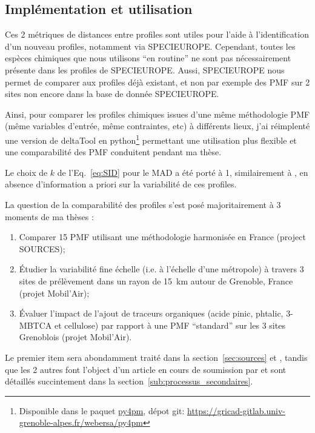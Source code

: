 \subsection{Implémentation et utilisation}%
\label{sub:implémentation_et_utilisation}

Ces 2 métriques de distances entre profiles sont utiles pour l'aide à l'identification
d'un nouveau profiles, notamment via SPECIEUROPE. Cependant, toutes les espèces chimiques
que nous utilisons ``en routine'' ne sont pas nécessairement présente dans les profiles de
SPECIEUROPE. Aussi, SPECIEUROPE nous permet de comparer aux profiles déjà existant, et non
par exemple des PMF sur 2 sites non encore dans la base de donnée SPECIEUROPE.

Ainsi, pour comparer les profiles chimiques issues d'une même méthodologie PMF (même
variables d'entrée, même contraintes, etc) à différents lieux, j'ai réimplenté une version
de deltaTool en python\footnote{Disponible dans le paquet
    \href{https://pypi.org/project/py4pm/}{py4pm}, dépot git:
\url{https://gricad-gitlab.univ-grenoble-alpes.fr/webersa/py4pm}
} permettant une
utilisation plus flexible et une comparabilité des PMF conduitent pendant ma thèse.

Le choix de $k$ de l'Eq.~\ref{eq:SID} pour le MAD a été porté à 1, similairement à
\cite{pernigottiDeltaSA2018}, en absence d'information a priori sur la variabilité de ces
profiles.

La question de la comparabilité des profiles s'est posé majoritairement à 3 moments de ma
thèses :
\begin{enumerate}
    \item Comparer 15 PMF utilisant une méthodologie harmonisée en France (project
        SOURCES);
    \item Étudier la variabilité fine échelle (i.e. à l'échelle d'une métropole) à travers
        3 sites de prélèvement dans un rayon de \SI{15}{\kilo\m} autour de Grenoble, France
        (projet Mobil'Air);
    \item Évaluer l'impact de l'ajout de traceurs organiques (acide pinic, phtalic,
        3-MBTCA et cellulose) par rapport à une PMF ``standard'' sur les 3 sites
        Grenoblois (projet Mobil'Air).
\end{enumerate}

Le premier item sera abondamment traité dans la section~\ref{sec:sources} et
\textcite{weberComparison2019}, tandis que les 2 autres font l'object d'un article en
cours de soumission par \textcite{borlazaFinescaleinprep.} et sont détaillés succintement
dans la section~\ref{sub:processus_secondaires}.

